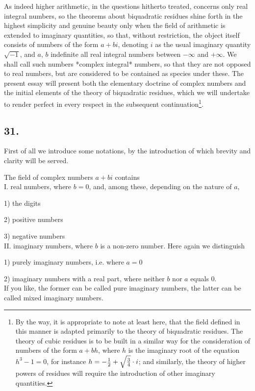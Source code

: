 \documentclass[twoside,12pt, showframe]{memoir}
\let\oldfrac\frac
\def\frac#1#2{\mathchoice{\tfrac{#1}{#2}}{\oldfrac{#1}{#2}}{\genfrac{}{}{}{2}{#1}{#2\mathstrut}}{\genfrac{}{}{}{3}{#1}{#2\mathstrut}}}
\begin{document}
As indeed higher arithmetic, in the questions hitherto treated, concerns only real integral numbers, so the theorems about biquadratic residues shine forth in the highest simplicity and genuine beauty only when the field of arithmetic is extended to imaginary quantities, so that, without restriction, the object itself consists of numbers of the form \(a+b i\), denoting \(i\) as the usual imaginary quantity \(\sqrt{-1}\), and \(a\), \(b\) indefinite all real integral numbers between \(-\infty\) and \(+\infty\). We shall call such numbers *complex integral* numbers, so that they are not opposed to real numbers, but are considered to be contained as species under these. The present essay will present both the elementary doctrine of complex numbers and the initial elements of the theory of biquadratic residues, which we will undertake to render perfect in every respect in the subsequent continuation\footnote{By the way, it is appropriate to note at least here, that the field defined in this manner is adapted primarily to the theory of biquadratic residues. The theory of cubic residues is to be built in a similar way for the consideration of numbers of the form \(a+b h\), where \(h\) is the imaginary root of the equation \(h^{3}-1=0\), for instance \(h=-\frac{1}{2}+\sqrt{\frac{3}{4}} \cdot i\); and similarly, the theory of higher powers of residues will require the introduction of other imaginary quantities.}.
%

\subsection*{31.}

First of all we introduce some notations, by the introduction of which brevity and clarity will be served.

The field of complex numbers \(a+bi\) contains\\
I. real numbers, where \(b=0\), and, among these, depending on the nature of \(a\),

1) the digits

2) positive numbers

3) negative numbers\\
II. imaginary numbers, where \(b\) is a non-zero number. Here again we distinguish

1) purely imaginary numbers, i.e. where \(a=0\)

2) imaginary numbers with a real part, where neither \(b\) nor \(a\) equals 0.\\
If you like, the former can be called pure imaginary numbers, the latter can be called mixed imaginary numbers.\clearpage
%
\end{document}
